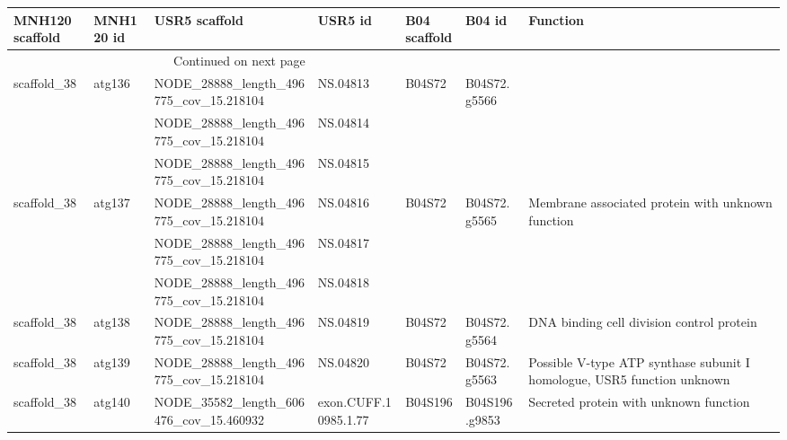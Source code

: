\begin{longtable}{lllllll}
\toprule
MNH120 scaffold & MNH120 id &                           USR5 scaffold &               USR5 id & B04 scaffold &         B04 id &                                     Function \\
\midrule
\endhead
\midrule
\multicolumn{3}{r}{{Continued on next page}} \\
\midrule
\endfoot

\bottomrule
\endlastfoot
    scaffold\_38 &    atg136 &  NODE\_28888\_length\_496775\_cov\_15.218104 &              NS.04813 &       B04S72 &   B04S72.g5566 &                                                   \\
                &           &  NODE\_28888\_length\_496775\_cov\_15.218104 &              NS.04814 &              &                &                                                     \\
                &           &  NODE\_28888\_length\_496775\_cov\_15.218104 &              NS.04815 &              &                &                                                    \\
    scaffold\_38 &    atg137 &  NODE\_28888\_length\_496775\_cov\_15.218104 &              NS.04816 &       B04S72 &   B04S72.g5565 &  Membrane associated protein with unknown function \\
                &           &  NODE\_28888\_length\_496775\_cov\_15.218104 &              NS.04817 &              &                &                                                    \\
                &           &  NODE\_28888\_length\_496775\_cov\_15.218104 &              NS.04818 &              &                &                                                    \\
    scaffold\_38 &    atg138 &  NODE\_28888\_length\_496775\_cov\_15.218104 &              NS.04819 &       B04S72 &   B04S72.g5564 &          DNA binding cell division control protein \\
    scaffold\_38 &    atg139 &  NODE\_28888\_length\_496775\_cov\_15.218104 &              NS.04820 &       B04S72 &   B04S72.g5563 &   Possible V-type ATP synthase subunit I homologue, USR5 function unknown \\
    scaffold\_38 &    atg140 &  NODE\_35582\_length\_606476\_cov\_15.460932 &  exon.CUFF.10985.1.77 &      B04S196 &  B04S196.g9853 &             Secreted protein with unknown function \\
\end{longtable}
